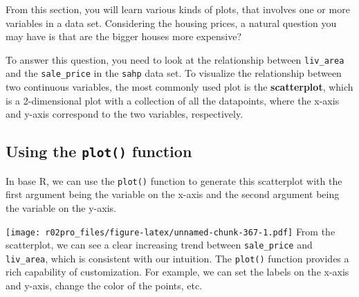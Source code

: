 \documentclass[
]{book}
\newenvironment{Shaded}{\begin{snugshade}}{\end{snugshade}}
\newcommand{\AttributeTok}[1]{\textcolor[rgb]{0.77,0.63,0.00}{#1}}
\newcommand{\FunctionTok}[1]{\textcolor[rgb]{0.00,0.00,0.00}{#1}}
\newcommand{\NormalTok}[1]{#1}
\newcommand{\SpecialCharTok}[1]{\textcolor[rgb]{0.00,0.00,0.00}{#1}}
\newcommand{\StringTok}[1]{\textcolor[rgb]{0.31,0.60,0.02}{#1}}
\begin{document}
From this section, you will learn various kinds of plots, that involves one or more variables in a data set. Considering the housing prices, a natural question you may have is that are the bigger houses more expensive?

To answer this question, you need to look at the relationship between \texttt{liv\_area} and the \texttt{sale\_price} in the \texttt{sahp} data set.
To visualize the relationship between two continuous variables, the most commonly used plot is the \textbf{scatterplot}, which is a 2-dimensional plot with a collection of all the datapoints, where the x-axis and y-axis correspond to the two variables, respectively.

\hypertarget{using-the-plot-function}{%
\subsection{\texorpdfstring{Using the \texttt{plot()} function}{Using the plot() function}}\label{using-the-plot-function}}

In base R, we can use the \texttt{plot()} function to generate this scatterplot with the first argument being the variable on the x-axis and the second argument being the variable on the y-axis.

\begin{Shaded}
\end{Shaded}

\texttt{[image: r02pro\_files/figure-latex/unnamed-chunk-367-1.pdf]}
From the scatterplot, we can see a clear increasing trend between \texttt{sale\_price} and \texttt{liv\_area}, which is consistent with our intuition. The \texttt{plot()} function provides a rich capability of customization. For example, we can set the labels on the x-axis and y-axis, change the color of the points, etc.

\begin{Shaded}
\end{Shaded}
\end{document}
